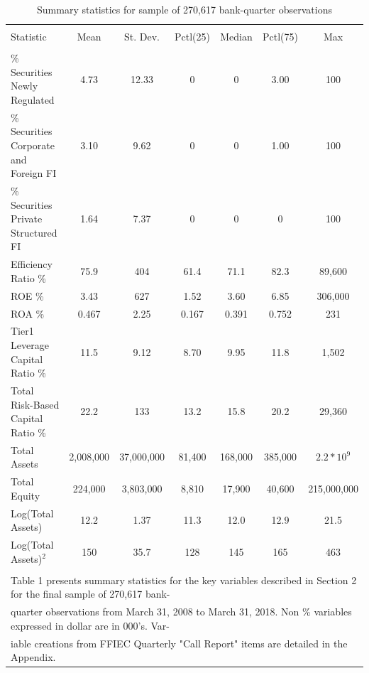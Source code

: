 \documentclass[preprint,12pt]{elsarticle}
\begin{document}
\begin{table}
\caption{Summary statistics for sample of 270,617 bank-quarter observations} 
\label{Table 1}
\small
\begin{tabular}{@{\extracolsep{5pt}}lcccccc} 
\\[-1.8ex]\hline 
\hline \\[-1.8ex] 
Statistic & \multicolumn{1}{c}{Mean} & \multicolumn{1}{c}{St. Dev.} & \multicolumn{1}{c}{Pctl(25)} & \multicolumn{1}{c}{Median} & \multicolumn{1}{c}{Pctl(75)} & \multicolumn{1}{c}{Max} \\ 
\hline \\[-1.8ex]  
\% Securities Newly Regulated & 4.73 & 12.33 & 0 & 0 & 3.00 & 100 \\ 
\% Securities Corporate and Foreign FI & 3.10 & 9.62 & 0 & 0 & 1.00 & 100 \\ 
\% Securities Private Structured FI & 1.64 & 7.37 & 0 & 0 & 0 & 100 \\ 
Efficiency Ratio \% & 75.9 & 404 & 61.4 & 71.1 & 82.3 & 89,600 \\ 
ROE \% & 3.43 & 627 & 1.52 & 3.60 & 6.85 & 306,000 \\ 
ROA \% & 0.467 & 2.25 & 0.167 & 0.391 & 0.752 & 231 \\ 
Tier1 Leverage Capital Ratio \% & 11.5 & 9.12 & 8.70 & 9.95 & 11.8 & 1,502 \\ 
Total Risk-Based Capital Ratio \% & 22.2 & 133 & 13.2 & 15.8 & 20.2 & 29,360 \\
Total Assets & 2,008,000 & 37,000,000 & 81,400 & 168,000 & 385,000 & $2.2 * 10^{9}$ \\ 
Total Equity & 224,000 & 3,803,000 & 8,810 & 17,900 & 40,600 & 215,000,000 \\ 
Log(Total Assets) & 12.2 & 1.37 & 11.3 & 12.0 & 12.9 & 21.5 \\ 
Log(Total Assets)$^{2}$ & 150 & 35.7 & 128 & 145 & 165 & 463 \\ 
\hline \\[-1.8ex] 
\multicolumn{7}{l}{Table 1 presents summary statistics for the key variables described in Section 2 for the final sample of 270,617 bank-} \\
\multicolumn{7}{l}{quarter observations from March 31, 2008 to March 31, 2018.  Non \% variables expressed in dollar are in 000's.  Var-} \\
\multicolumn{7}{l}{iable creations from FFIEC Quarterly "Call Report" items are detailed in the Appendix.} 
\end{tabular} 
\end{table} 
\end{document}
